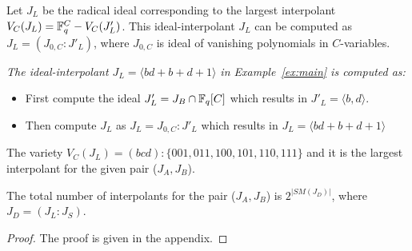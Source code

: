 Let $J_L$ be the radical ideal corresponding to the largest
interpolant ${V_C}(J_L) = {\mathbb{F}}_{q}^C - {V_C}(J'_L)$. This ideal-interpolant
$J_L$ can be computed as $J_L = (J_{0,C}:J'_L)$, where $J_{0,C}$ is
ideal of vanishing polynomials in $C$-variables.  


\begin{Example}
{\it 
The ideal-interpolant $J_L = \langle bd + b + d + 1 \rangle$ in 
Example~\ref{ex:main} is computed as:
\begin{itemize}
	\item First compute the ideal $J'_L = J_B \cap {\mathbb{F}}_{q}[C]$ which results in 
	$J'_L = \langle b,d \rangle$.
	\item Then compute $J_L$ as $J_L = J_{0,C}: J'_L$ which results in
	$J_L = \langle bd + b + d + 1 \rangle$
\end{itemize}
The variety $V_C(J_L)=(bcd):\{001,011,100,101,110,111\}$ and it is the
largest interpolant for the given pair ($J_A,J_B$). 
}
\end{Example}

\begin{Lemma}
\label{noofinter}
The total number of interpolants for the pair ($J_A,J_B$) is
$2^{|SM(J_D)|}$, where $J_D = (J_L:J_S)$. 
\end{Lemma}

\begin{proof}
The proof is given in the appendix. 


\end{proof}

